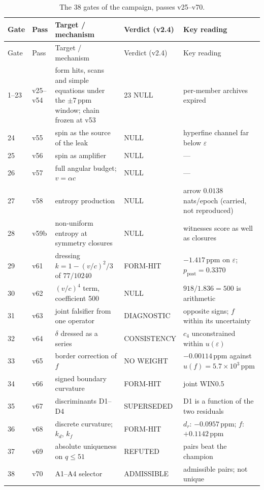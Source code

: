 \documentclass[11pt,a4paper]{article}
\newcommand{\ppm}{\ensuremath{\,\mathrm{ppm}}}
\begin{document}
{\small\setlength{\tabcolsep}{4pt}
\begin{longtable}{@{}p{}p{}p{}p{}>{\raggedright\arraybackslash}p{}@{}}
\caption{The 38 gates of the campaign, passes v25--v70.}\label{tab:gates}\\
\toprule
Gate & Pass & Target / mechanism & Verdict (v2.4) & Key reading \\
\midrule
\endfirsthead
\toprule
Gate & Pass & Target / mechanism & Verdict (v2.4) & Key reading \\
\midrule
\endhead
1--23 & v25--v54 & form hits, scans and simple equations under the $\pm7\ppm$ window; chain frozen at v53 & 23 NULL & per-member archives expired \\
24 & v55 & spin as the source of the leak & NULL & hyperfine channel far below $\varepsilon$ \\
25 & v56 & spin as amplifier & NULL & --- \\
26 & v57 & full angular budget; $v = \alpha c$ & NULL & --- \\
27 & v58 & entropy production & NULL & arrow $0.0138$ nats/epoch (carried, not reproduced) \\
28 & v59b & non-uniform entropy at symmetry closures & NULL & witnesses score as well as closures \\
29 & v61 & dressing $k = 1-(v/c)^2/3$ of $77/10240$ & FORM-HIT & $-1.417\ppm$ on $\varepsilon$; $p_{\mathrm{post}} = 0.3370$ \\
30 & v62 & $(v/c)^4$ term, coefficient 500 & NULL & $918/1.836 = 500$ is arithmetic \\
31 & v63 & joint falsifier from one operator & DIAGNOSTIC & opposite signs; $f$ within its uncertainty \\
32 & v64 & $\delta$ dressed as a series & CONSISTENCY & $c_4$ unconstrained within $u(\varepsilon)$ \\
33 & v65 & border correction of $f$ & NO WEIGHT & $-0.00114\ppm$ against $u(f) = 5.7\times10^3\ppm$ \\
34 & v66 & signed boundary curvature & FORM-HIT & joint WIN0.5 \\
35 & v67 & discriminants D1--D4 & SUPERSEDED & D1 is a function of the two residuals \\
36 & v68 & discrete curvature; $k_d$, $k_f$ & FORM-HIT & $d_r$: $-0.0957\ppm$; $f$: $+0.1142\ppm$ \\
37 & v69 & absolute uniqueness on $q\le51$ & REFUTED & 16 pairs beat the champion \\
38 & v70 & A1--A4 selector & ADMISSIBLE & 6 admissible pairs; not unique \\
\bottomrule
\end{longtable}}
\end{document}
